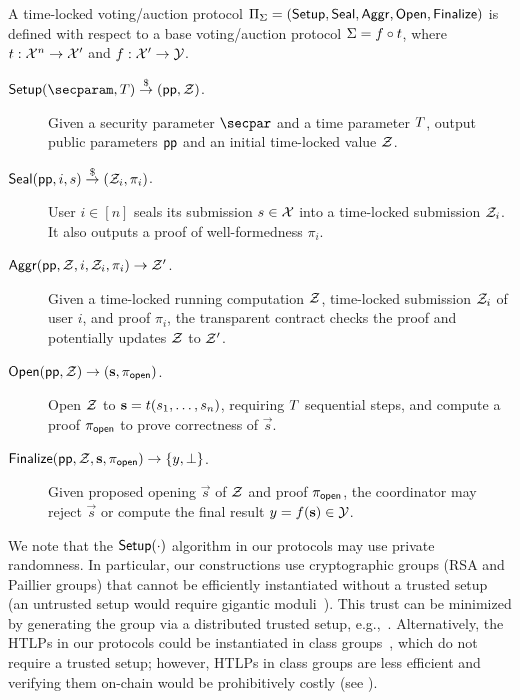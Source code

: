\begin{definition}\label{def:syntax}
A time-locked voting/auction protocol $\Pi_\Sigma = (\mathsf{Setup}, \mathsf{Seal},\allowbreak \mathsf{Aggr}, \mathsf{Open}, \mathsf{Finalize})$ is defined with respect to a base voting/auction protocol $\Sigma = f \circ t$, where $t : \mathcal{X}^n \to \mathcal{X}'$ and $f : \mathcal{X}' \to \mathcal{Y}$. %

\begin{description}
    \item[$\Setup(\secparam, \Ttime) \randout (\pp, \Z)$.] Given a security parameter $\secpar$ and a time parameter $T$, output public parameters $\mathsf{pp}$ and an initial time-locked value $\mathcal{Z}$.
    \item[$\mathsf{Seal}(\mathsf{pp}, i, s) \stackrel{\$}{\to} (\mathcal{Z}_i, \pi_i)$.] User $i\in[n]$ seals its submission $s \in \mathcal{X}$ into a time-locked submission %
    $\mathcal{Z}_i$. It also outputs a proof of well-formedness $\pi_i$.
    \item[$\mathsf{Aggr}(\mathsf{pp}, \mathcal{Z}, i, \mathcal{Z}_i, \pi_i) \to \mathcal{Z}'$.] Given a time-locked running computation %
    $\mathcal{Z}$, time-locked submission $\mathcal{Z}_i$ of user $i$, and proof $\pi_i$, the transparent contract checks the proof and potentially updates $\mathcal{Z}$ to $\mathcal{Z}'$. %
    \item[$\mathsf{Open}(\mathsf{pp}, \mathcal{Z}) \to (\mathbf{s}, \pi_{\mathsf{open}})$.] Open $\mathcal{Z}$ to $\mathbf{s} = t(s_1, \dots, s_n)$, requiring $T$ sequential steps, and compute a proof $\pi_{\mathsf{open}}$ to prove correctness of $\vec{s}$.
    \item[$\mathsf{Finalize}(\mathsf{pp}, \mathcal{Z}, \mathbf{s}, \pi_{\mathsf{open}}) \to \{y, \perp\}$.] Given proposed opening $\vec{s}$ of $\mathcal{Z}$ and proof $\pi_{\sf open}$, the coordinator may reject $\vec{s}$ or compute the final result $y = f(\mathbf{s}) \in \mathcal{Y}$. %
\end{description}
\end{definition}

We note that the $\mathsf{Setup}(\cdot)$ algorithm in our protocols may use private randomness. In particular, our constructions use cryptographic groups (RSA and Paillier groups) that cannot be efficiently instantiated without a trusted setup (an untrusted setup would require gigantic moduli~\cite{ICICS:Sander99}). This trust can be minimized by generating the group via a distributed trusted setup, e.g.,~\cite{JACM:BonFra01,SP:CHIKMRsVW21,TCC:DamMik10}.
Alternatively, the HTLPs in our protocols could be instantiated in class groups~\cite{CCS:TCLM21}, which do not require a trusted setup; however, HTLPs in class groups are less efficient and verifying them on-chain would be prohibitively costly 
(see ).

